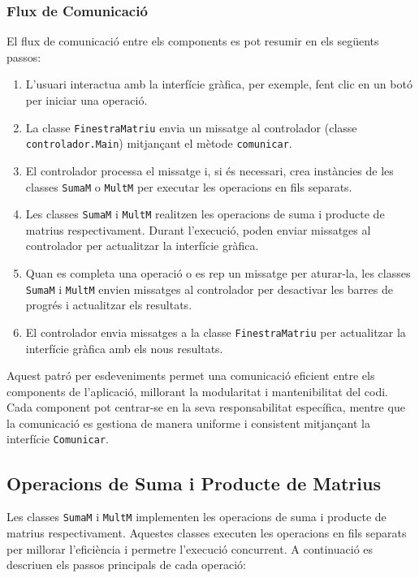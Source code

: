 \documentclass{ieeetj}
\begin{document}
\subsubsection{Flux de Comunicació}
El flux de comunicació entre els components es pot resumir en els següents passos:

\begin{enumerate}
    \item L'usuari interactua amb la interfície gràfica, per exemple, fent clic en un botó per iniciar una operació.
    \item La classe \texttt{FinestraMatriu} envia un missatge al controlador (classe \texttt{controlador.Main}) mitjançant el mètode \texttt{comunicar}.
    \item El controlador processa el missatge i, si és necessari, crea instàncies de les classes \texttt{SumaM} o \texttt{MultM} per executar les operacions en fils separats.
    \item Les classes \texttt{SumaM} i \texttt{MultM} realitzen les operacions de suma i producte de matrius respectivament. Durant l'execució, poden enviar missatges al controlador per actualitzar la interfície gràfica.
    \item Quan es completa una operació o es rep un missatge per aturar-la, les classes \texttt{SumaM} i \texttt{MultM} envien missatges al controlador per desactivar les barres de progrés i actualitzar els resultats.
    \item El controlador envia missatges a la classe \texttt{FinestraMatriu} per actualitzar la interfície gràfica amb els nous resultats.
\end{enumerate}

Aquest patró per esdeveniments permet una comunicació eficient entre els components de l'aplicació, millorant la modularitat i mantenibilitat del codi. Cada component pot centrar-se en la seva responsabilitat específica, mentre que la comunicació es gestiona de manera uniforme i consistent mitjançant la interfície \texttt{Comunicar}.

\subsection{Operacions de Suma i Producte de Matrius}
Les classes \texttt{SumaM} i \texttt{MultM} implementen les operacions de suma i producte de matrius respectivament. Aquestes classes executen les operacions en fils separats per millorar l'eficiència i permetre l'execució concurrent. A continuació es descriuen els passos principals de cada operació:
\end{document}
